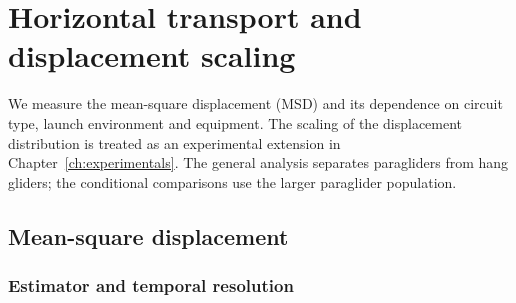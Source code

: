 \chapter{Horizontal transport and displacement scaling}
\label{ch:fixed-transport}






We measure the mean-square displacement (MSD) and its dependence on circuit type,
launch environment and equipment. The scaling of the displacement distribution is
treated as an experimental extension in Chapter~\ref{ch:experimentals}.
The general analysis separates paragliders from hang gliders; the conditional
comparisons use the larger paraglider population.

\section{Mean-square displacement}
\label{sec:fixed-msd}
\subsection{Estimator and temporal resolution}

